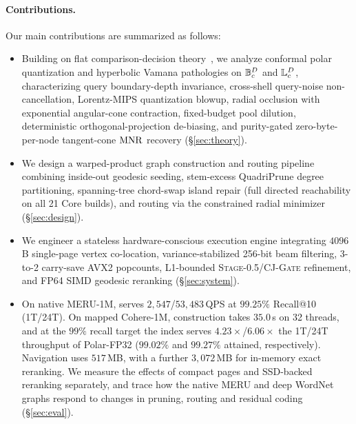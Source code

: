 \paragraph{Contributions.}
Our main contributions are summarized as follows:
\begin{itemize}
  \item Building on flat comparison-decision theory~\cite{xiao2026decisions}, we analyze conformal polar quantization and hyperbolic {Vamana} pathologies on $\mathbb{B}_c^D$ and $\mathbb{L}_c^D$, characterizing query boundary-depth invariance, cross-shell query-noise non-cancellation, Lorentz-MIPS quantization blowup, radial occlusion with exponential angular-cone contraction, fixed-budget pool dilution, deterministic orthogonal-projection de-biasing, and purity-gated zero-byte-per-node tangent-cone {$\mathrm{MNR}$} recovery (\S\ref{sec:theory}).
  \item We design a warped-product graph construction and routing pipeline combining inside-out geodesic seeding, stem-excess {QuadriPrune} degree partitioning, spanning-tree chord-swap island repair (full directed reachability on all 21 Core builds), and routing via the constrained radial minimizer (\S\ref{sec:design}).
  \item We engineer a stateless hardware-conscious execution engine integrating $4096$\,B single-page vertex co-location, variance-stabilized 256-bit beam filtering, 3-to-2 carry-save {AVX2} popcounts, L1-bounded \textsc{Stage-0.5}/\textsc{CJ-Gate} refinement, and FP64 {SIMD} geodesic reranking (\S\ref{sec:system}).
  \item On native {MERU-1M}, \rquiver{} serves $2{,}547$/$53{,}483$\,QPS at $99.25\%$ Recall@10 (1T/24T). On mapped {Cohere-1M}, construction takes $35.0$\,s on 32 threads, and at the $99\%$ recall target the index serves $4.23\times$/$6.06\times$ the 1T/24T throughput of {Polar-FP32} ($99.02\%$ and $99.27\%$ attained, respectively). Navigation uses $517$\,MB, with a further $3{,}072$\,MB for in-memory exact reranking. We measure the effects of compact pages and SSD-backed reranking separately, and trace how the native {MERU} and deep {WordNet} graphs respond to changes in pruning, routing and residual coding (\S\ref{sec:eval}).
\end{itemize}
